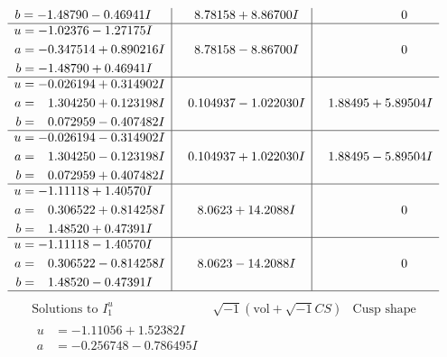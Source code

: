 \documentclass[1p]{elsarticle_modified}
\theoremstyle{definition}
\newcommand{\I}{\sqrt{-1}}
\begin{document}
$$\begin{array}{c|c|c}
\begin{aligned}
b &= -1.48790 - 0.46941 I\end{aligned}
 & \phantom{-}8.78158 + 8.86700 I & \phantom{-0.000000 } 0 \\ \hline\begin{aligned}
u &= -1.02376 - 1.27175 I \\
a &= -0.347514 + 0.890216 I \\
b &= -1.48790 + 0.46941 I\end{aligned}
 & \phantom{-}8.78158 - 8.86700 I & \phantom{-0.000000 } 0 \\ \hline\begin{aligned}
u &= -0.026194 + 0.314902 I \\
a &= \phantom{-}1.304250 + 0.123198 I \\
b &= \phantom{-}0.072959 - 0.407482 I\end{aligned}
 & \phantom{-}0.104937 - 1.022030 I & \phantom{-}1.88495 + 5.89504 I \\ \hline\begin{aligned}
u &= -0.026194 - 0.314902 I \\
a &= \phantom{-}1.304250 - 0.123198 I \\
b &= \phantom{-}0.072959 + 0.407482 I\end{aligned}
 & \phantom{-}0.104937 + 1.022030 I & \phantom{-}1.88495 - 5.89504 I \\ \hline\begin{aligned}
u &= -1.11118 + 1.40570 I \\
a &= \phantom{-}0.306522 + 0.814258 I \\
b &= \phantom{-}1.48520 + 0.47391 I\end{aligned}
 & \phantom{-}8.0623 + 14.2088 I & \phantom{-0.000000 } 0 \\ \hline\begin{aligned}
u &= -1.11118 - 1.40570 I \\
a &= \phantom{-}0.306522 - 0.814258 I \\
b &= \phantom{-}1.48520 - 0.47391 I\end{aligned}
 & \phantom{-}8.0623 - 14.2088 I & \phantom{-0.000000 } 0\\
 \hline 
 \end{array}$$\newpage$$\begin{array}{c|c|c}  
\text{Solutions to }I^u_{1}& \I (\text{vol} + \sqrt{-1}CS) & \text{Cusp shape}\\
 \hline 
\begin{aligned}
u &= -1.11056 + 1.52382 I \\
a &= -0.256748 - 0.786495 I \\

\end{aligned}
\end{array}$$
\end{document}
